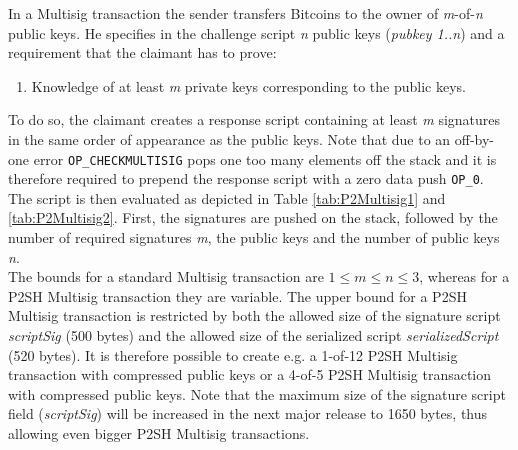 \noindent
In a Multisig transaction the sender transfers Bitcoins to the owner of \textit{m}-of-\textit{n} public keys. He specifies in the challenge script \textit{n} public keys (\textit{pubkey 1..n}) and a requirement that the claimant has to prove:

\begin{enumerate}[label=\arabic*), leftmargin=1cm]
\item Knowledge of at least \textit{m} private keys corresponding to the public keys.
\end{enumerate}

\noindent
To do so, the claimant creates a response script containing at least \textit{m} signatures in the same order of appearance as the public keys. Note that due to an off-by-one error {\tt OP\_CHECKMULTISIG} pops one too many elements off the stack and it is therefore required to prepend the response script with a zero data push {\tt OP\_0}. The script is then evaluated as depicted in Table \ref{tab:P2Multisig1} and \ref{tab:P2Multisig2}. First, the signatures are pushed on the stack, followed by the number of required signatures \textit{m}, the public keys and the number of public keys \textit{n}.~\\

\noindent
The bounds for a standard Multisig transaction are $1 \leq m \leq n \leq 3$, whereas for a P2SH Multisig transaction they are variable. The upper bound for a P2SH Multisig transaction is restricted by both the allowed size of the signature script \textit{scriptSig} (500 bytes) and the allowed size of the serialized script \textit{serializedScript} (520 bytes). It is therefore possible to create e.g. a 1-of-12 P2SH Multisig transaction with compressed public keys or a 4-of-5 P2SH Multisig transaction with compressed public keys. Note that the maximum size of the signature script field (\textit{scriptSig}) will be increased in the next major release to 1650 bytes, thus allowing even bigger P2SH Multisig transactions.

